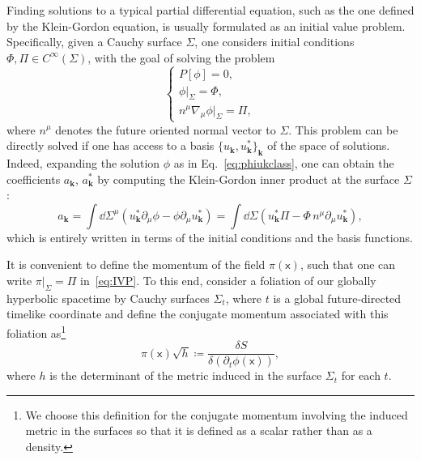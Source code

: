 \documentclass[letterpaper,12pt,titlepage,oneside,final]{book}
\newcommand{\mf}{\mathsf}%
\begin{document}
Finding solutions to a typical partial differential equation, such as the one defined by the Klein-Gordon equation, is usually formulated as an initial value problem. Specifically, given a Cauchy surface $\Sigma$, one considers initial conditions $\Phi,\Pi\in C^{\infty}(\Sigma)$, with the goal of solving the problem
\begin{equation}\label{eq:IVP}
    \begin{cases}
        P[\phi] = 0,\\
        \phi|_{\Sigma} = \Phi,\\
        n^\mu \nabla_\mu \phi |_\Sigma =\Pi,
    \end{cases}
\end{equation}
where $n^\mu$ denotes the future oriented normal vector to $\Sigma$. This problem can be directly solved if one has access to a basis $\{u_{\bm k}, u_{\bm k}^*\}_{\bm k}$ of the space of solutions. Indeed, expanding the solution $\phi$ as in Eq.~\eqref{eq:phiukclass}, one can obtain the coefficients $a_{\bm k}$, $a_{\bm k}^*$ by computing the Klein-Gordon inner product at the surface $\Sigma$:
\begin{equation}
    a_{\bm k} = \int \dd \Sigma^\mu (u_{\bm k}^* \partial_\mu \phi -  \phi\partial_\mu u_{\bm k}^*) =  \int \dd \Sigma (u_{\bm k}^* \Pi -  \Phi \, n^\mu \partial_\mu u_{\bm k}^*),
\end{equation}
which is entirely written in terms of the initial conditions and the basis functions.

It is convenient to define the momentum of the field $\pi(\mf x)$, such that one can write $\pi|_{\Sigma} = \Pi$ in~\eqref{eq:IVP}. To this end, consider a foliation of our globally hyperbolic spacetime by Cauchy surfaces $\Sigma_t$, where $t$ is a global future-directed timelike coordinate and define the conjugate momentum associated with this foliation as\footnote{We choose this definition for the conjugate momentum involving the induced metric in the surfaces so that it is defined as a scalar rather than as a density.}
\begin{equation}\label{eq:conjpi}
    \pi(\mf x)\sqrt{h} \coloneqq \frac{\delta S}{\delta(\partial_t\phi(\mf x))},
\end{equation}
where $h$ is the determinant of the metric induced in the surface $\Sigma_t$ for each $t$.
\end{document}
